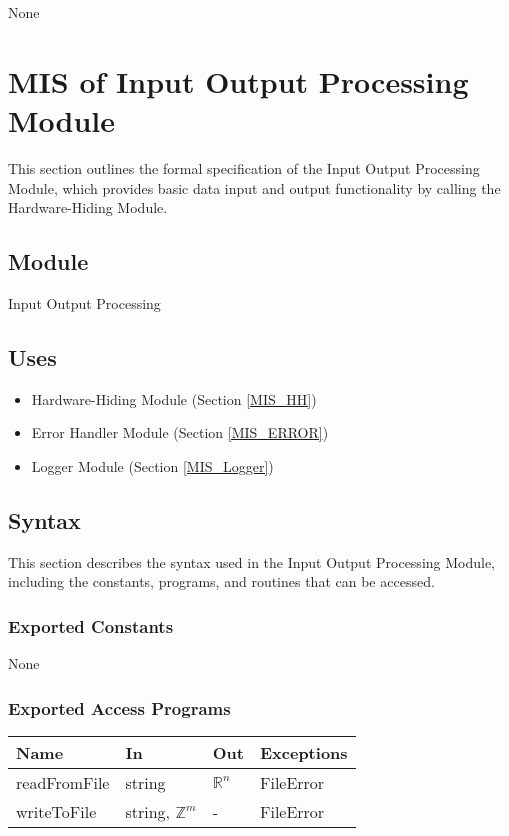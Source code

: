 \documentclass[12pt, titlepage]{article}
\begin{document}
None

\newpage

\section{MIS of Input Output Processing Module} \label{MIS_IO}

This section outlines the formal specification of the Input Output Processing
Module, which provides basic data input and output functionality by calling the
Hardware-Hiding Module.

\subsection{Module}

Input Output Processing

\subsection{Uses}

\begin{itemize}
\item Hardware-Hiding Module (Section \ref{MIS_HH})
\item Error Handler Module (Section \ref{MIS_ERROR})
\item Logger Module (Section \ref{MIS_Logger})
\end{itemize}

\subsection{Syntax}

This section describes the syntax used in the Input Output Processing Module,
including the constants, programs, and routines that can be accessed.

\subsubsection{Exported Constants}

None

\subsubsection{Exported Access Programs}

\begin{center}
\begin{tabular}{p{3cm} p{4cm} p{4cm} p{2cm}}
\hline
\textbf{Name} & \textbf{In} & \textbf{Out} & \textbf{Exceptions} \\
\hline
readFromFile & string & $\mathbb{R}^n$ & FileError \\
writeToFile & string, $\mathbb{Z}^m$ & - & FileError \\
\hline
\end{tabular}
\end{center}
\end{document}
